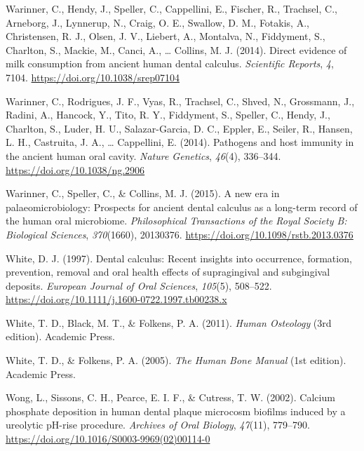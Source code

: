 \documentclass[
  b5paper,
]{book}
\newlength{\cslhangindent}
\newlength{\cslentryspacingunit} %
\newenvironment{CSLReferences}[2] %
 {%
  \setlength{\parindent}{0pt}
  \ifodd #1
  \let\oldpar\par
  \def\par{\hangindent=\cslhangindent\oldpar}
  \fi
  \setlength{\parskip}{#2\cslentryspacingunit}
 }%
 {}
\begin{document}
\begin{CSLReferences}{1}{0}
\leavevmode{}%
Warinner, C., Hendy, J., Speller, C., Cappellini, E., Fischer, R.,
Trachsel, C., Arneborg, J., Lynnerup, N., Craig, O. E., Swallow, D. M.,
Fotakis, A., Christensen, R. J., Olsen, J. V., Liebert, A., Montalva,
N., Fiddyment, S., Charlton, S., Mackie, M., Canci, A., \ldots{}
Collins, M. J. (2014). Direct evidence of milk consumption from ancient
human dental calculus. \emph{Scientific Reports}, \emph{4}, 7104.
\url{https://doi.org/10.1038/srep07104}

\leavevmode{}%
Warinner, C., Rodrigues, J. F., Vyas, R., Trachsel, C., Shved, N.,
Grossmann, J., Radini, A., Hancock, Y., Tito, R. Y., Fiddyment, S.,
Speller, C., Hendy, J., Charlton, S., Luder, H. U., Salazar-Garcia, D.
C., Eppler, E., Seiler, R., Hansen, L. H., Castruita, J. A., \ldots{}
Cappellini, E. (2014). Pathogens and host immunity in the ancient human
oral cavity. \emph{Nature Genetics}, \emph{46}(4), 336--344.
\url{https://doi.org/10.1038/ng.2906}

\leavevmode{}%
Warinner, C., Speller, C., \& Collins, M. J. (2015). A new era in
palaeomicrobiology: Prospects for ancient dental calculus as a long-term
record of the human oral microbiome. \emph{Philosophical Transactions of
the Royal Society B: Biological Sciences}, \emph{370}(1660), 20130376.
\url{https://doi.org/10.1098/rstb.2013.0376}

\leavevmode{}%
White, D. J. (1997). Dental calculus: Recent insights into occurrence,
formation, prevention, removal and oral health effects of supragingival
and subgingival deposits. \emph{European Journal of Oral Sciences},
\emph{105}(5), 508--522.
\url{https://doi.org/10.1111/j.1600-0722.1997.tb00238.x}

\leavevmode{}%
White, T. D., Black, M. T., \& Folkens, P. A. (2011). \emph{Human
{Osteology}} (3rd edition). {Academic Press}.

\leavevmode{}%
White, T. D., \& Folkens, P. A. (2005). \emph{The {Human Bone Manual}}
(1st edition). {Academic Press}.

\leavevmode{}%
Wong, L., Sissons, C. H., Pearce, E. I. F., \& Cutress, T. W. (2002).
Calcium phosphate deposition in human dental plaque microcosm biofilms
induced by a ureolytic {pH-rise} procedure. \emph{Archives of Oral
Biology}, \emph{47}(11), 779--790.
\url{https://doi.org/10.1016/S0003-9969(02)00114-0}


\end{CSLReferences}
\end{document}
